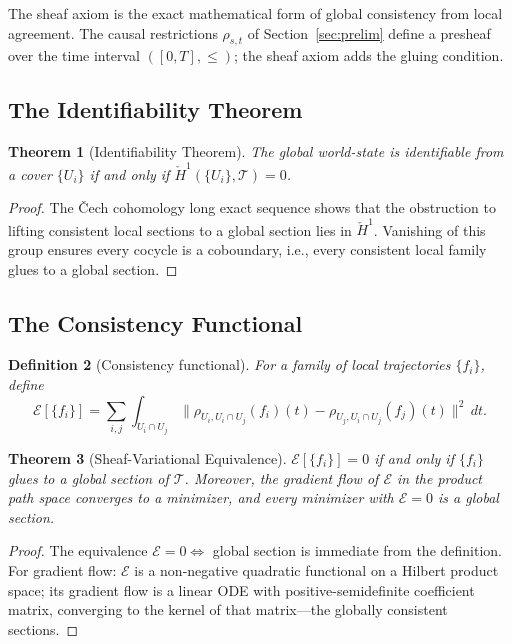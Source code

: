 \documentclass[12pt]{article}
\newtheorem{theorem}{Theorem}[section]
\newtheorem{definition}[theorem]{Definition}
\begin{document}
The sheaf axiom is the exact mathematical form of global consistency from
local agreement. The causal restrictions $\rho_{s,t}$ of
Section~\ref{sec:prelim} define a presheaf over the time interval
$([0,T], \leq)$; the sheaf axiom adds the gluing condition.

\subsection{The Identifiability Theorem}

\begin{theorem}[Identifiability Theorem]
\label{thm:identifiability}
The global world-state is identifiable from a cover $\{U_i\}$ if and only if
$\check{H}^1(\{U_i\}, \mathscr{T}) = 0$.
\end{theorem}

\begin{proof}
The \v{C}ech cohomology long exact sequence shows that the obstruction
to lifting consistent local sections to a global section lies in
$\check{H}^1$. Vanishing of this group ensures every cocycle is a
coboundary, i.e., every consistent local family glues to a global section.
\end{proof}

\subsection{The Consistency Functional}

\begin{definition}[Consistency functional]
For a family of local trajectories $\{f_i\}$, define
\[
  \mathcal{E}[\{f_i\}] = \sum_{i,j}
  \int_{U_i\cap U_j}
  \|\rho_{U_i, U_i\cap U_j}(f_i)(t)
  - \rho_{U_j, U_i\cap U_j}(f_j)(t)\|^2\, dt.
\]
\end{definition}

\begin{theorem}[Sheaf-Variational Equivalence]
\label{thm:sheafvar}
$\mathcal{E}[\{f_i\}] = 0$ if and only if $\{f_i\}$ glues to a global
section of $\mathscr{T}$. Moreover, the gradient flow of $\mathcal{E}$
in the product path space converges to a minimizer, and every minimizer
with $\mathcal{E} = 0$ is a global section.
\end{theorem}

\begin{proof}
The equivalence $\mathcal{E} = 0 \Leftrightarrow$ global section is
immediate from the definition. For gradient flow: $\mathcal{E}$ is a
non-negative quadratic functional on a Hilbert product space; its gradient
flow is a linear ODE with positive-semidefinite coefficient matrix,
converging to the kernel of that matrix---the globally consistent sections.
\end{proof}
\end{document}
